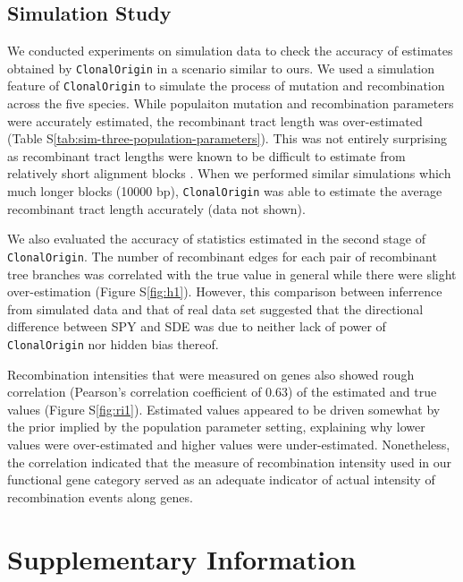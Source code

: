 \documentclass[english]{article}
\begin{document}
\subsection{Simulation Study}
We conducted experiments on simulation data to check the accuracy of estimates
obtained by \texttt{ClonalOrigin} in a scenario similar to ours. We used a
simulation feature of \texttt{ClonalOrigin} to simulate the process of mutation
and recombination across the five species.  While populaiton mutation and
recombination parameters were accurately estimated, the recombinant
tract length was over-estimated  (Table
S\ref{tab:sim-three-population-parameters}).  This was not entirely surprising
as recombinant tract lengths were known to be difficult to estimate from
relatively short alignment blocks \citep{Didelot2010}. When we performed similar
simulations which much longer blocks (10000 bp), \texttt{ClonalOrigin} was able
to estimate the average recombinant tract length accurately (data not shown).  

We also evaluated the accuracy of statistics estimated in the second stage of
\texttt{ClonalOrigin}. The number of recombinant edges for each pair of recombinant
tree branches was correlated with the true value in general 
while there were slight over-estimation (Figure S\ref{fig:h1}). 
However, this comparison between inferrence from simulated data and that of 
real data set suggested that the directional difference between SPY and SDE was 
due to neither lack of power of \texttt{ClonalOrigin} nor hidden bias thereof.

Recombination intensities that were measured on genes also showed rough
correlation (Pearson's correlation coefficient of 0.63) of the estimated and
true values (Figure S\ref{fig:ri1}).  Estimated values appeared to be driven
somewhat by the prior implied by the population parameter setting, explaining
why lower values were over-estimated and higher values were under-estimated.
Nonetheless, the correlation indicated that the measure of recombination
intensity used in our functional gene category served as an adequate indicator
of actual intensity of recombination events along genes.

\clearpage{}

\section*{Supplementary Information}
\end{document}
